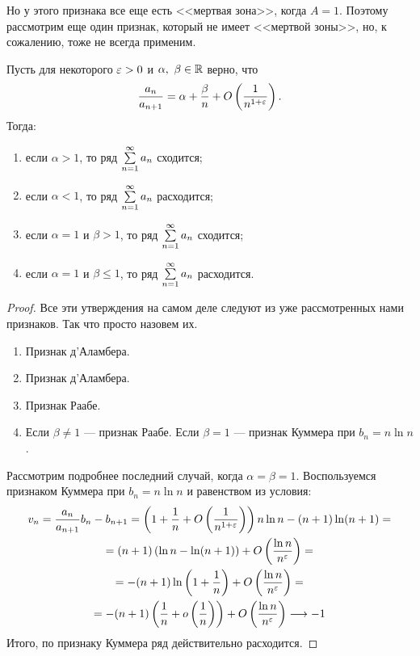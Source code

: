 \documentclass[a4paper, 12pt]{article}
\begin{document}
Но у этого признака все еще есть <<мертвая зона>>, когда $A = 1$. Поэтому рассмотрим еще один признак, который не имеет <<мертвой зоны>>, но, к сожалению, тоже не всегда применим.

\begin{Test}
Пусть для некоторого $\varepsilon > 0$ и $\alpha,\ \beta \in \mathbb{R}$ верно, что 
$$
\dfrac{a_n}{a_{n+1}} = \alpha + \frac{\beta}{n} + O\left( \frac{1}{n^{1+\varepsilon}} \right).
$$
Тогда:
\begin{enumerate}
\item если $\alpha > 1$, то ряд $\sum\limits_{n=1}^{\infty}a_n$ сходится;
\item если $\alpha < 1$, то ряд $\sum\limits_{n=1}^{\infty}a_n$ расходится;
\item если $\alpha=1$ и $\beta>1$, то ряд $\sum\limits_{n=1}^{\infty}a_n$ сходится;
\item если $\alpha=1$ и $\beta\leq1$, то ряд $\sum\limits_{n=1}^{\infty}a_n$ расходится.
\end{enumerate}
\end{Test}

\begin{proof}
Все эти утверждения на самом деле следуют из уже рассмотренных нами признаков. Так что просто назовем их.
\begin{enumerate}
\item Признак д'Аламбера.
\item Признак д'Аламбера.
\item Признак Раабе.
\item Если $\beta\neq1$ --- признак Раабе. Если $\beta = 1$ --- признак Куммера при $b_n = n\ln n$.
\end{enumerate}
Рассмотрим подробнее последний случай, когда $\alpha=\beta=1$. Воспользуемся признаком Куммера при $b_n = n\ln n$ и равенством из условия:
\begin{gather*}
v_n = \frac{a_n}{a_{n+1}}b_n - b_{n+1} = \left( 1 + \frac{1}{n} + O\left( \frac{1}{n^{1+\varepsilon}}\right) \right)n\ln n - (n+1)\ln(n+1) = \\
= (n+1)\left( \ln n - \ln(n+1) \right) + O\left( \frac{\ln n}{n^\varepsilon} \right) = \\
= -(n+1)\ln\left( 1 + \frac{1}{n} \right) + O\left( \frac{\ln n}{n^\varepsilon} \right) = \\
= -(n+1)\left( \frac{1}{n} + o\left(\frac{1}{n}\right) \right) + O\left( \frac{\ln n}{n^\varepsilon} \right) \longrightarrow -1
\end{gather*}
Итого, по признаку Куммера ряд действительно расходится.
\end{proof}
\end{document}

